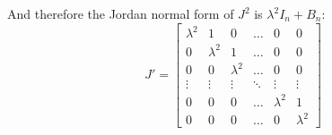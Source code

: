 \documentclass[crop=false,class=article]{standalone}                           %
\begin{document}
    And therefore the Jordan normal form of $J^{2}$ is $\lambda^{2}I_{n}+B_{n}$:
    \begin{equation}
        J'=
        \begin{bmatrix}
            \lambda^{2}&1&0&\dots&0&0\\
            0&\lambda^{2}&1&\dots&0&0\\
            0&0&\lambda^{2}&\dots&0&0\\
            \vdots&\vdots&\vdots&\ddots&\vdots&\vdots\\
            0&0&0&\dots&\lambda^{2}&1\\
            0&0&0&\dots&0&\lambda^{2}
        \end{bmatrix}
    \end{equation}
\end{document}
